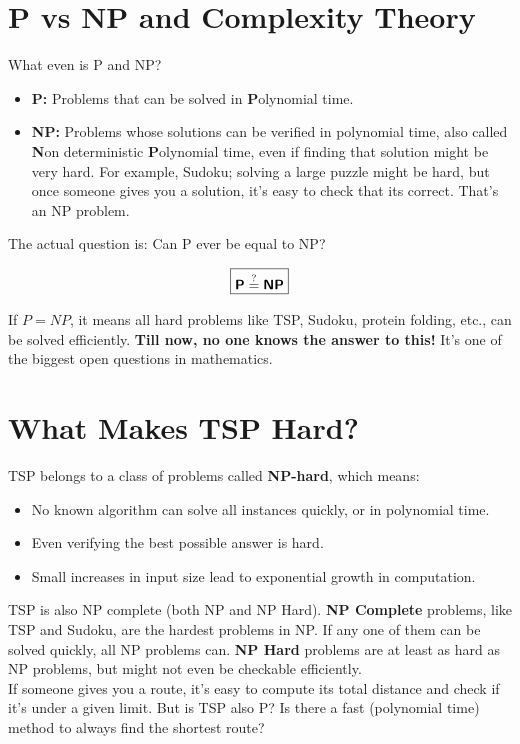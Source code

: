 \documentclass[12pt]{exam}
\newcommand{\classX}[1]{\ensuremath{\text{\textsf{\textbf{#1}}}}}
\newcommand{\classP}{\classX{P}}
\newcommand{\classNP}{\classX{NP}}
\begin{document}
\section{P vs NP and Complexity Theory}
What even is P and NP?

\begin{itemize}
    \item \textbf{P:} Problems that can be solved in \textbf{P}olynomial time.
    \item \textbf{NP:} Problems whose solutions can be verified in polynomial time, also called \textbf{N}on deterministic \textbf{P}olynomial time, even if finding that solution might be very hard. For example, Sudoku; solving a large puzzle might be hard, but once someone gives you a solution, it's easy to check that its correct. That's an NP problem.
\end{itemize}

The actual question is: Can P ever be equal to NP? 

\[
\boxed{
    \classP \overset{?}{=} \classNP
}
\]

If $P = NP$, it means all hard problems like TSP, Sudoku, protein folding, etc., can be solved efficiently. \textbf{Till now, no one knows the answer to this!} It’s one of the biggest open questions in mathematics.

\section{What Makes TSP Hard?}

TSP belongs to a class of problems called \textbf{NP-hard}, which means:
\begin{itemize}
    \item No known algorithm can solve all instances quickly, or in polynomial time.
    \item Even verifying the best possible answer is hard.
    \item Small increases in input size lead to exponential growth in computation.
\end{itemize}

TSP is also NP complete (both NP and NP Hard). \textbf{NP Complete} problems, like TSP and Sudoku, are the hardest problems in NP. If any one of them can be solved quickly, all NP problems can. \textbf{NP Hard} problems are at least as hard as NP problems, but might not even be checkable efficiently.\\
If someone gives you a route, it’s easy to compute its total distance and check if it’s under a given limit. But is TSP also P? Is there a fast (polynomial time) method to always find the shortest route?\\
\end{document}
